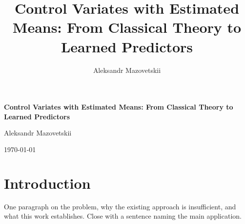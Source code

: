 \documentclass{article}
\title{Control Variates with Estimated Means: From Classical Theory to Learned Predictors}
\author{Aleksandr Mazovetskii}
\begin{document}
\begin{titlepage}
    \vspace*{\fill} 
    \begin{center}
        {\Huge \bfseries Control Variates with Estimated Means: From Classical Theory to Learned Predictors\par}
        \vspace{1.5cm}
        {\Large Aleksandr Mazovetskii\par}
        \vspace{1cm}
        {\large \today\par}
    \end{center}
    \vspace*{\fill} 
    
\end{titlepage}

\tableofcontents
\newpage

\section{Introduction}
One paragraph on the problem, why the existing approach is insufficient, and what
this work establishes. Close with a sentence naming the main application.



\newpage


\end{document}
